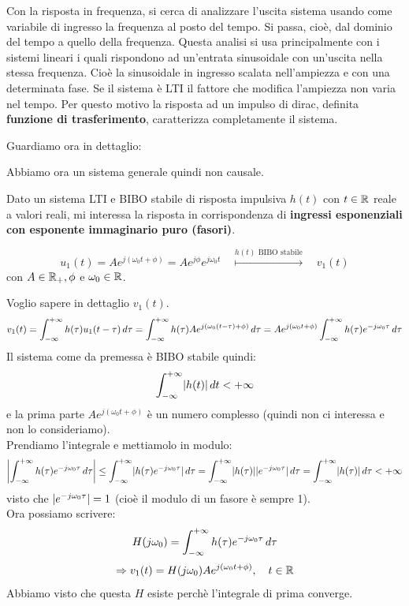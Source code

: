 	Con la risposta in frequenza, si cerca di analizzare l'uscita sistema usando come variabile di ingresso la frequenza al posto del tempo. Si passa, cioè, dal dominio del tempo a quello della frequenza.
	Questa analisi si usa principalmente con i sistemi lineari i quali rispondono ad un'entrata sinusoidale con un'uscita nella stessa frequenza. Cioè la sinusoidale in ingresso scalata nell'ampiezza e con una determinata fase. Se il sistema è LTI il fattore che modifica l'ampiezza non varia nel tempo.
	Per questo motivo la risposta ad un impulso di dirac, definita \textbf{funzione di trasferimento}, caratterizza completamente il sistema. 
	
	Guardiamo ora in dettaglio:
	
	Abbiamo ora un sistema generale quindi non causale.
	
	Dato un sistema LTI e BIBO stabile di risposta impulsiva $h(t)$ con $ t \in \mathbb{R}$ reale a valori reali, mi interessa la risposta in corrispondenza di \textbf{ingressi esponenziali con esponente immaginario puro (fasori)}.
	
	\[ 
		 u_1(t) =Ae^{j(\omega_0 t + \phi)}= Ae^{j\phi}e^{j\omega_0 t} \quad \overset{h(t)\text{ BIBO stabile}}{\longmapsto} \quad v_1(t)
	\]
	con $A \in \mathbb{R}_+, \phi$ e $\omega_0 \in \mathbb{R}$.
	
	Voglio sapere in dettaglio $ v_1(t)$.\\
	\[
		v_1(t) 
		= \int_{-\infty}^{+\infty}h(\tau)u_1(t-\tau)\, d\tau
		= \int_{-\infty}^{+\infty}h(\tau)Ae^{j(\omega_0(t-\tau)+\phi)}\, d\tau
		= Ae^{j(\omega_0 t+\phi)}
		\int_{-\infty}^{+\infty}h(\tau)e^{-j\omega_0 \tau} \, d\tau
	\]
	Il sistema come da premessa è BIBO stabile quindi:
	\[ \int_{-\infty}^{+\infty}\lvert h(t) \rvert \, d t < +\infty \]
	e la prima parte $ Ae^{j(\omega_0 t+\phi)} $ è un numero complesso (quindi non ci interessa e non lo consideriamo).\\
	Prendiamo l'integrale e mettiamolo in modulo:
	\[
		\Abs{\int_{-\infty}^{+\infty}h(\tau)e^{-j\omega_0 \tau}\d\tau} 
		\le \int_{-\infty}^{+\infty}\abs{h(\tau)e^{-j\omega_0 \tau}}\d\tau
		= \int_{-\infty}^{+\infty}\abs{h(\tau)}\abs{e^{-j\omega_0 \tau}}\d\tau
		= \int_{-\infty}^{+\infty}\abs{h(\tau)}\d\tau < +\infty
	\]
	visto che $\lvert e^{-j\omega_0 \tau}\rvert =1$ (cioè il modulo di un fasore è sempre 1).\\
	Ora possiamo scrivere:
	\[
		H(j\omega_0) = \int_{-\infty}^{+\infty}h(\tau)e^{-j\omega_0 \tau}\, d\tau
	\]
	\[
		\Rightarrow v_1(t)=H(j\omega_0) A e^{j(\omega_0 t + \phi)}, \quad t \in \mathbb{R}
	\]
	Abbiamo visto che questa $ H $ esiste perchè l'integrale di prima converge.
	
